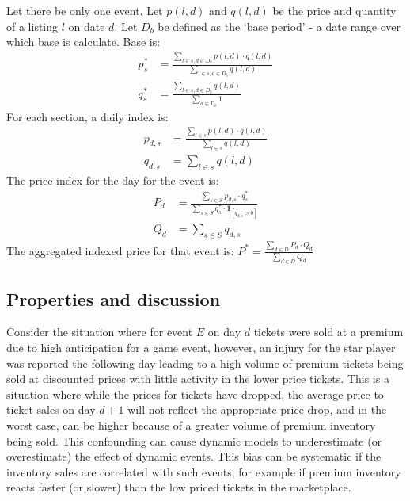 \documentclass[letterpaper, 12pt]{article}
\begin{document}
Let there be only one event. Let $p(l,d)$ and $q(l,d)$ be the price and quantity of a listing $l$ on date $d$. Let $D_b$ be defined as the `base period' - a date range over which base is calculate. Base is:
\begin{align*}
	p^*_s &= \frac{\sum_{l\in s, d\in D_b} p(l,d)\cdot q(l,d)}{\sum_{l\in s, d\in D_b} q(l,d)} \\
	q^*_s &= \frac{\sum_{l\in s, d\in D_b} q(l,d)}{\sum_{d\in D_b} 1} 
\end{align*}
For each section, a daily index is:
\begin{align*}
	p_{d,s} &= \frac{\sum_{l\in s} p(l,d)\cdot q(l,d)}{\sum_{l\in s} q(l,d)}\\
	q_{d,s} &= \sum_{l\in s} q(l,d)
\end{align*}
The price index for the day for the event is:
\begin{align*}
	P_d &=  \frac{\sum_{s\in S} p_{d,s}\cdot q^*_s}{\sum_{s\in S} q^*_s\cdot \pmb{1}_{[q_{d,s} > 0]} }\\
	Q_d &= \sum_{s\in S} q_{d,s}
\end{align*}
The aggregated indexed price for that event is: $P^* = \frac{\sum_{d\in D}P_d\cdot Q_d}{\sum_{d\in D}Q_d}$ \\

\subsection{Properties and discussion}
Consider the situation where for event $E$ on day $d$ tickets were sold at a premium due to high anticipation for a game event, however, an injury for the star player was reported the following day leading to a high volume of premium tickets being sold at discounted prices with little activity in the lower price tickets. This is a situation where while the prices for tickets have dropped, the average price to ticket sales on day $d+1$ will not reflect the appropriate price drop, and in the worst case, can be higher because of a greater volume of premium inventory being sold. This confounding can cause dynamic models to underestimate (or overestimate) the effect of dynamic events. This bias can be systematic if the inventory sales are correlated with such events, for example if premium inventory reacts faster (or slower) than the low priced tickets in the marketplace.
\end{document}
